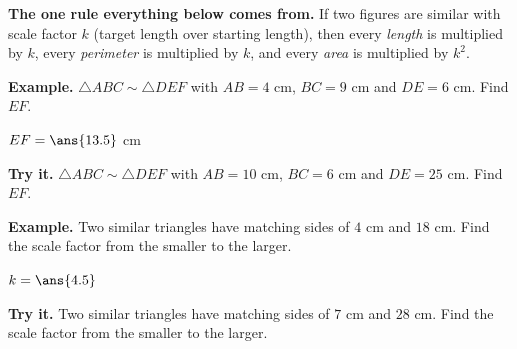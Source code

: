 \documentclass[12pt]{article}
\begin{document}

\begin{formulabox}
\textbf{The one rule everything below comes from.} If two figures are similar
with scale factor $k$ (target length over starting length), then every
\emph{length} is multiplied by $k$, every \emph{perimeter} is multiplied by $k$,
and every \emph{area} is multiplied by $k^2$.
\end{formulabox}


\begin{examplebox}
\textbf{Example.} $\triangle ABC \sim \triangle DEF$ with $AB = 4$ cm,
$BC = 9$ cm and $DE = 6$ cm. Find $EF$.

$EF = \ans{13.5}$ cm
\end{examplebox}

\begin{tryitbox}
\textbf{Try it.} $\triangle ABC \sim \triangle DEF$ with $AB = 10$ cm,
$BC = 6$ cm and $DE = 25$ cm. Find $EF$.\\[2pt]
\end{tryitbox}


\begin{examplebox}
\textbf{Example.} Two similar triangles have matching sides of $4$ cm and
$18$ cm. Find the scale factor from the smaller to the larger.

$k = \ans{4.5}$
\end{examplebox}

\begin{tryitbox}
\textbf{Try it.} Two similar triangles have matching sides of $7$ cm and
$28$ cm. Find the scale factor from the smaller to the larger.\\[2pt]
\end{tryitbox}

\end{document}
